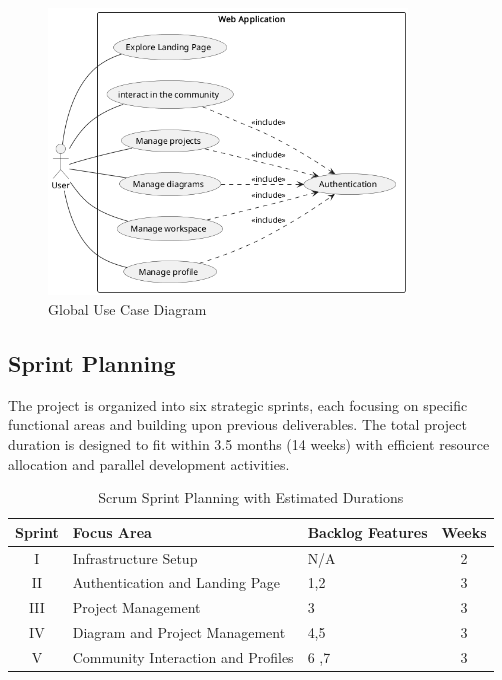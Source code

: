\begin{figure}[H]
    \centering
    \includegraphics[width=0.85\textwidth]{./conception/global_use_case_diagram.png}
    \caption{Global Use Case Diagram}
    \label{fig:global_use_case}
\end{figure}

\subsection{Sprint Planning}

The project is organized into six strategic sprints, each focusing on specific functional areas and building upon previous deliverables. The total project duration is designed to fit within 3.5 months (14 weeks) with efficient resource allocation and parallel development activities.

\begin{table}[h!]
    \centering
    \begin{tabular}{|c|l|l|c|}
        \hline
        \textbf{Sprint} & \textbf{Focus Area}                                & \textbf{Backlog Features}                                   & \textbf{Weeks} \\ \hline
        I              & Infrastructure Setup                               & N/A                                                     & 2                                   \\ \hline
        II             & Authentication and Landing Page                    & 1,2                              & 3                                 \\ \hline
        III            & Project Management                                 & 3                            & 3                                   \\ \hline
        IV             & Diagram and Project Management                     & 4,5                            & 3                                   \\ \hline
        V              & Community Interaction and Profiles                 & 6 ,7                          & 3                                   \\ \hline
    \end{tabular}
    \caption{Scrum Sprint Planning with Estimated Durations}
\end{table}


